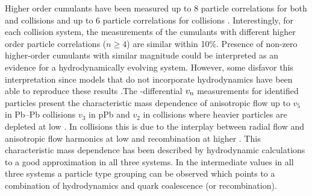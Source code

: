 \documentclass[../report.tex]{subfiles}
\begin{document}
Higher order cumulants have been measured up to 8 particle correlations for both \PbPb{} and \pPb{} collisions and up to 6 particle correlations for \pp{} collisions \cite{Aad:2013fja,Chatrchyan:2013nka,Khachatryan:2016txc,Aamodt:2010pa,ALICE:2011ab,Chatrchyan:2012ta,Abelev:2014mda,Chatrchyan:2013kba,Aad:2014vba,Khachatryan:2015waa,Adam:2016izf,CMS:2015ica,Sirunyan:2017pan,Sirunyan:2017igb,Aaboud:2017acw,Aaboud:2017blb}. Interestingly, for each collision system, the measurements of the cumulants with different higher order particle correlations ($n \geq 4$) are similar within 10\%. Presence of non-zero higher-order cumulants with similar magnitude could be interpreted as an evidence for a hydrodynamically evolving system. However, some disfavor this interpretation since models that do not incorporate hydrodynamics have been able to reproduce these results \cite{Sjostrand:2006za,Jia:2014pza,Gyulassy:2014cfa,McLerran:2014uka}.The \pt-differential $v_{\rm{n}}$ measurements for identified particles present the characteristic mass dependence of anisotropic flow up to $v_{5}$ in Pb--Pb collisions $v_{3}$ in pPb and $v_{2}$ in \pp{} collisions where heavier particles are depleted at low \pt{} \cite{Abelev:2014pua,Abelev:2012di,Adam:2016nfo,Khachatryan:2014jra,ABELEV:2013wsa,CMS:2015kua,Khachatryan:2016txc,Acharya:2018zuq}. In \PbPb{} collisions this is due to the interplay between radial flow and anisotropic flow harmonics at low \pt{} and recombination at higher \pt. This characteristic mass dependence has been described by hydrodynamic calculations to a good approximation in all three systems. In the intermediate \pt{} values in all three systems a particle type grouping can be observed which points to a combination of hydrodynamics and quark coalescence (or recombination).
\end{document}
